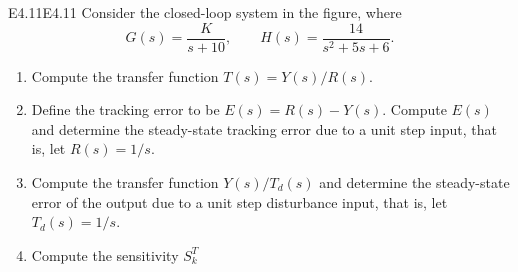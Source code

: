 
\begin{problemwithimage}{E4.11}{E4.11}
  Consider the closed-loop system in the figure, where
  \begin{equation*}
    G(s) = \frac{K}{s + 10}, \qquad H(s) = \frac{14}{s^2 + 5s + 6}
  .\end{equation*}
  \begin{enumerate}[label=(\alph*)]
    \item Compute the transfer function $T(s) = Y(s) / R(s)$.
    \item Define the tracking error to be $E(s) = R(s) - Y(s)$.
      Compute $E(s)$ and determine the steady-state tracking error due to a unit step input, that is, let $R(s) = 1 / s$.
    \item Compute the transfer function $Y(s) / T_d(s)$ and determine the steady-state error of the output due to a unit step disturbance input, that is, let $T_{d}(s) = 1 / s$.
    \item Compute the sensitivity $S_k^{T}$
  \end{enumerate}
\end{problemwithimage}
